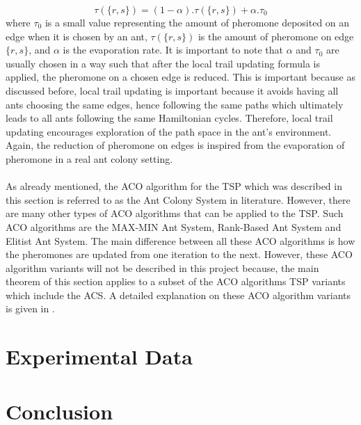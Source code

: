 \documentclass{article}
\begin{document}
\begin{equation}
  \label{eq:aco4}
  \tau(\{r,s\})=(1-\alpha).\tau(\{r,s\})+\alpha.\tau_0
\end{equation}
where $\tau_0$ is a small value representing the amount of pheromone deposited on an edge when it is chosen by an ant, $\tau(\{r,s\})$ is the amount of pheromone on edge $\{r,s\}$, and $\alpha$ is the evaporation rate. It is important to note that $\alpha$ and $\tau_0$ are usually chosen in a way such that after the local trail updating formula is applied, the pheromone on a chosen edge is reduced. This is important because as discussed before, local trail updating is important because it avoids having all ants choosing the same edges, hence following the same paths which ultimately leads to all ants following the same Hamiltonian cycles. Therefore, local trail updating encourages exploration of the path space in the ant's environment. Again, the reduction of pheromone on edges is inspired from the evaporation of pheromone in a real ant colony setting.  \cite{dorigo_gambardella_1997}\\\\
As already mentioned, the ACO algorithm for the TSP which was described in this section is referred to as the Ant Colony System in literature. However, there are many other types of ACO algorithms that can be applied to the TSP. Such ACO algorithms are the MAX-MIN Ant System, Rank-Based Ant System and Elitist Ant System. The main difference between all these ACO algorithms is how the pheromones are updated from one iteration to the next. However, these ACO algorithm variants will not be described in this project because, the main theorem of this section applies to a subset of the ACO algorithms TSP variants which include the ACS. A detailed explanation on these ACO algorithm variants is given in \cite{dorigo_stutzle_thomas_2004}.
\newpage
\section{Experimental Data}
\newpage
\section{Conclusion}
\newpage

\nocite{*}

\end{document}
